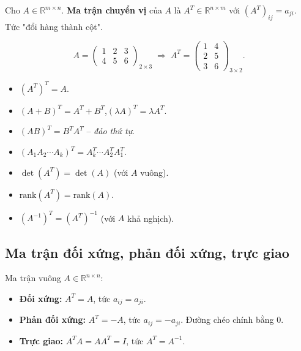\documentclass[12pt,a4paper]{article}
\begin{document}
\begin{dinhnghia}
  Cho $A \in \mathbb{R}^{m \times n}$. \textbf{Ma trận chuyển vị} của $A$ là $A^T \in \mathbb{R}^{n \times m}$ với $(A^T)_{ij} = a_{ji}$. Tức "đổi hàng thành cột".
\end{dinhnghia}

\begin{vidu}
\[
  A = \begin{pmatrix}1 & 2 & 3\\ 4 & 5 & 6\end{pmatrix}_{2\times 3} \;\Longrightarrow\; A^T = \begin{pmatrix}1 & 4\\ 2 & 5\\ 3 & 6\end{pmatrix}_{3 \times 2}.
\]
\end{vidu}

\begin{tinhchat}[title={Tính chất chuyển vị}]
\begin{itemize}
  \item $(A^T)^T = A$.
  \item $(A+B)^T = A^T + B^T$,\quad $(\lambda A)^T = \lambda A^T$.
  \item $\boxed{(AB)^T = B^T A^T}$ -- \emph{đảo thứ tự}.
  \item $(A_1 A_2 \cdots A_k)^T = A_k^T \cdots A_2^T A_1^T$.
  \item $\det(A^T) = \det(A)$ (với $A$ vuông).
  \item $\mathrm{rank}(A^T) = \mathrm{rank}(A)$.
  \item $(A^{-1})^T = (A^T)^{-1}$ (với $A$ khả nghịch).
\end{itemize}
\end{tinhchat}

\subsection{Ma trận đối xứng, phản đối xứng, trực giao}

\begin{dinhnghia}
  Ma trận vuông $A \in \mathbb{R}^{n \times n}$:
  \begin{itemize}
    \item \textbf{Đối xứng:} $A^T = A$, tức $a_{ij} = a_{ji}$.
    \item \textbf{Phản đối xứng:} $A^T = -A$, tức $a_{ij} = -a_{ji}$. Đường chéo chính bằng 0.
    \item \textbf{Trực giao:} $A^T A = A A^T = I$, tức $A^T = A^{-1}$.
  \end{itemize}
\end{dinhnghia}
\end{document}
